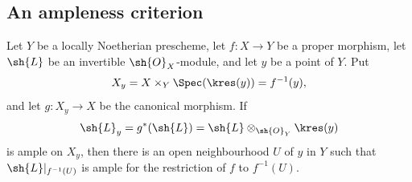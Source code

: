 \subsection{An ampleness criterion}
\label{subsection:III.4.7}

\begin{theorem}[4.7.1]
\label{III.4.7.1}
Let $Y$ be a locally Noetherian prescheme, let $f:X\to Y$ be a
proper morphism, let $\sh{L}$ be an invertible $\sh{O}_X$-module,
and let $y$ be a point of $Y$.  Put
\[
  X_y=X\times_Y\Spec(\kres(y))=f^{-1}(y),
\]
and let $g:X_y\to X$ be the canonical morphism.  If
\[
  \sh{L}_y=g^*(\sh{L})
  =\sh{L}\otimes_{\sh{O}_Y}\kres(y)
\]
is ample on $X_y$, then there is an open neighbourhood $U$ of $y$
in $Y$ such that $\sh{L}|_{f^{-1}(U)}$ is ample for the restriction
of $f$ to $f^{-1}(U)$.
\end{theorem}

